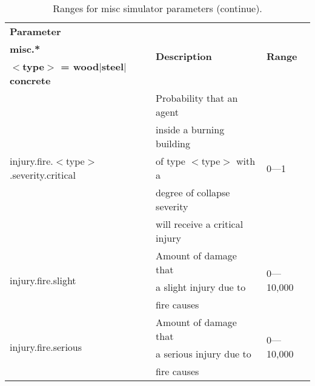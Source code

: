 \documentclass{article}
\begin{document}
\begin{table}[htb]
\caption{Ranges for misc simulator parameters (continue).}
\label{tab:13}
\centering
\begin{tabular}{lll}
  \hline
  \textbf{Parameter}                                        &
  \multirow{3}{*}{\textbf{Description}} & \multirow{3}{*}{\textbf{Range}}\\
  \textbf{misc.*}                                           &                  
                                        & \\
  \textbf{$<$type$>$ = wood$|$steel$|$concrete}             &                  
                                        & \\
  \hline
  \multirow{5}{*}{injury.fire.$<$type$>$.severity.critical} & Probability that
  an agent                              & \multirow{5}{*}{0---1}\\
                                                            & inside a burning
  building                              & \\
                                                            & of type $<$type$>$
  with a                                & \\
                                                            & degree of collapse
  severity                              & \\
                                                            & will receive a
  critical injury                       & \\
  \hline
  \multirow{3}{*}{injury.fire.slight}                       & Amount of damage
  that                                  & \multirow{3}{*}{0---10,000}\\
                                                            & a slight injury
  due to                                & \\
                                                            & fire causes      
                                        & \\
  \hline
  \multirow{3}{*}{injury.fire.serious}                      & Amount of damage
  that                                  & \multirow{3}{*}{0---10,000}\\
                                                            & a serious injury
  due to                                & \\
                                                            & fire causes      
                                        & \\

\end{tabular}
\end{table}
\end{document}
